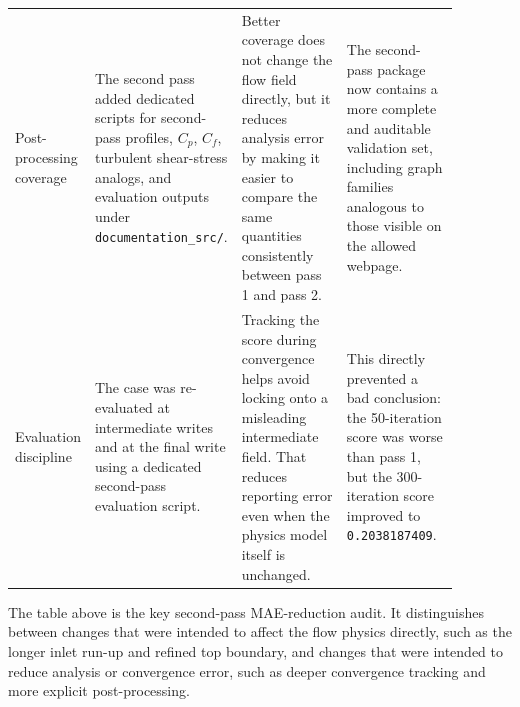 \documentclass[11pt]{article}
\begin{document}
\begin{longtable}{p{0.16\linewidth} p{0.18\linewidth} p{0.27\linewidth} p{0.27\linewidth}}
Post-processing coverage & The second pass added dedicated scripts for second-pass profiles, \(C_p\), \(C_f\), turbulent shear-stress analogs, and evaluation outputs under \texttt{documentation\_src/}. & Better coverage does not change the flow field directly, but it reduces analysis error by making it easier to compare the same quantities consistently between pass 1 and pass 2. & The second-pass package now contains a more complete and auditable validation set, including graph families analogous to those visible on the allowed webpage. \\
Evaluation discipline & The case was re-evaluated at intermediate writes and at the final write using a dedicated second-pass evaluation script. & Tracking the score during convergence helps avoid locking onto a misleading intermediate field. That reduces reporting error even when the physics model itself is unchanged. & This directly prevented a bad conclusion: the 50-iteration score was worse than pass 1, but the 300-iteration score improved to \texttt{0.2038187409}. \\
\bottomrule
\end{longtable}
\normalsize

The table above is the key second-pass MAE-reduction audit. It distinguishes between changes that were intended to affect the flow physics directly, such as the longer inlet run-up and refined top boundary, and changes that were intended to reduce analysis or convergence error, such as deeper convergence tracking and more explicit post-processing.
\end{document}
